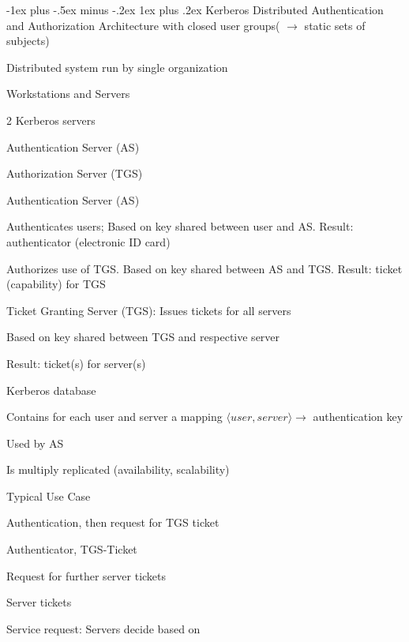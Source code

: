\documentclass[a4paper]{article}
\makeatletter
\renewcommand{\subsubsection}{\@startsection{subsubsection}{3}{0mm}%
                {-1ex plus -.5ex minus -.2ex}%
                {1ex plus .2ex}%
                {\normalfont\small\bfseries}}
\makeatother
\begin{document}
\begin{multicols}{3}
    \subsubsection{Kerberos}
    Distributed Authentication and Authorization Architecture with closed user groups( $\rightarrow$ static sets of subjects)
    \begin{itemize*}
        \item Distributed system run by single organization
        \item Workstations and Servers
        \item 2 Kerberos servers
        \begin{itemize*}
            \item Authentication Server (AS)
            \item Authorization Server (TGS)
        \end{itemize*}
        \item Authentication Server (AS)
        \begin{itemize*}
            \item Authenticates users; Based on key shared between user and AS. Result: authenticator (electronic ID card)
            \item Authorizes use of TGS. Based on key shared between AS and TGS. Result: ticket (capability) for TGS
        \end{itemize*}
        \item Ticket Granting Server (TGS): Issues tickets for all servers
        \begin{itemize*}
            \item Based on key shared between TGS and respective server
            \item Result: ticket(s) for server(s)
        \end{itemize*}
        \item Kerberos database
        \begin{itemize*}
            \item Contains for each user and server a mapping $⟨user, server⟩\rightarrow$ authentication key
            \item Used by AS
            \item Is multiply replicated (availability, scalability)
        \end{itemize*}
    \end{itemize*}

    Typical Use Case
    \begin{enumerate*}
        \item Authentication, then request for TGS ticket
        \item Authenticator, TGS-Ticket
        \item Request for further server tickets
        \item Server tickets
        \item Service request: Servers decide based on
    \end{enumerate*}


\end{multicols}
\end{document}
